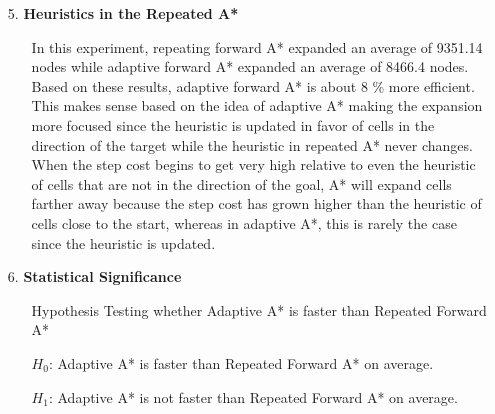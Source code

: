 \documentclass{article}
\begin{document}
\begin{enumerate}
\begin{enumerate}
            \end{enumerate}
        \item[5.] \textbf{Heuristics in the Repeated A*}
            \begin{enumerate}
                \item[] In this experiment, repeating forward A* expanded an average of 9351.14 nodes while adaptive forward A* expanded an average of 8466.4 nodes.  Based on these results, adaptive forward A* is about 8 \% more efficient.  This makes sense based on the idea of adaptive A* making the expansion more focused since the heuristic is updated in favor of cells in the direction of the target while the heuristic in repeated A* never changes.  When the step cost begins to get very high relative to even the heuristic of cells that are not in the direction of the goal, A* will expand cells farther away because the step cost has grown higher than the heuristic of cells close to the start, whereas in adaptive A*, this is rarely the case since the heuristic is updated.
            \end{enumerate}
        \item[6.] \textbf{Statistical Significance}\begin{enumerate}
            \item[]Hypothesis Testing whether Adaptive A* is faster than Repeated Forward A*
            \item[$H_0$:]Adaptive A* is faster than Repeated Forward A* on average.
            \item[$H_1$:] Adaptive A* is not faster than Repeated Forward A* on average.

\end{enumerate}
\end{enumerate}
\end{document}
